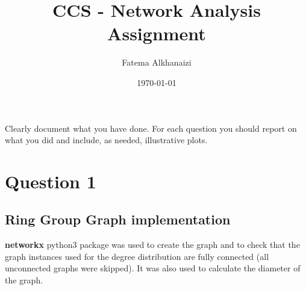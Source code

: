 \documentclass[11pt,a4paper,notitlepage]{article}
\title{CCS - Network Analysis Assignment}
\author{Fatema Alkhanaizi}
\date{\today}
\begin{document}
\graphicspath{ {../distributions/q2/} {../distributions/q1/} {../distributions/q3/} }

\maketitle

\noindent
Clearly document what you have done. For each question you should report on what you did and include, as needed, illustrative plots.

\section*{Question 1}
\subsection*{Ring Group Graph implementation}
\textbf{networkx} python3 package was used to create the graph and to check that the graph instances used for the degree distribution are fully connected (all unconnected graphs were skipped). It was also used to calculate the diameter of the graph.
\end{document}

